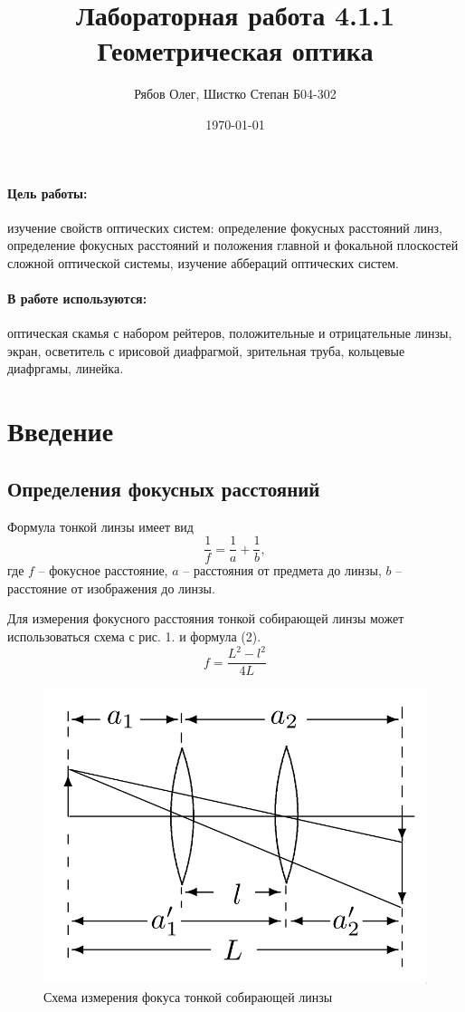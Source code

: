 \documentclass[a4paper,12pt]{article}
\author{Рябов Олег, Шистко Степан Б04-302}
\title{Лабораторная работа 4.1.1 \\
	\textbf{Геометрическая оптика}}
\date{\today}
\theoremstyle{definition}
\begin{document}
	
{\Large \maketitle}

	\paragraph*{Цель работы:} изучение свойств оптических систем: определение фокусных расстояний линз, определение фокусных расстояний и положения главной и фокальной плоскостей сложной оптической системы, изучение аббераций оптических систем.

	\paragraph*{В работе используются:} оптическая скамья с набором рейтеров, положительные и отрицательные линзы, экран, осветитель с ирисовой диафрагмой, зрительная труба, кольцевые диафргамы, линейка.

\section{Введение}
\subsection*{Определения фокусных расстояний}
Формула тонкой линзы имеет вид
\begin{equation}
    \frac{1}{f} = \frac{1}{a} + \frac{1}{b},
\end{equation}
\noindent
где $f$ -- фокусное расстояние, $a$ -- расстояния от предмета до линзы, $b$ -- расстояние от изображения до линзы.

\noindent
Для измерения фокусного расстояния тонкой собирающей линзы может использоваться схема с рис. 1. и формула (2).
\begin{equation}
    f = \frac{L^2 - l^2}{4L}
\end{equation}

\begin{figure}[H]
    \centering
    \includegraphics[scale=0.3]{pic_1.png}
    \caption{Схема измерения фокуса тонкой собирающей линзы}
\end{figure}
\end{document}
